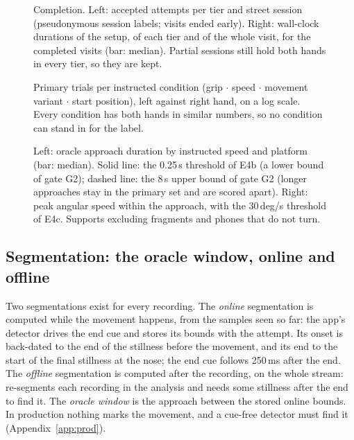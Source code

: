 \begin{figure}[htbp]
\centering
{}
\caption{Completion. Left: accepted attempts per tier and street session (pseudonymous session labels; 
visits ended early). Right: wall-clock durations of the setup, of each tier and of the whole visit, for the
completed visits (bar: median). Partial sessions still hold both hands in every tier, so they are kept.}
\label{fig:S2_03_completion_durations}
\end{figure}

\begin{figure}[htbp]
\centering
{}
\caption{Primary trials per instructed condition (grip $\cdot$ speed $\cdot$ movement variant $\cdot$ start
position), left against right hand, on a log scale. Every condition has both hands in similar numbers, so
no condition can stand in for the label.}
\label{fig:S2_04_conditions}
\end{figure}

\begin{figure}[htbp]
\centering
{}
\caption{Left: oracle approach duration by instructed speed and platform (bar: median). Solid line: the
0.25\,s threshold of E4b (a lower bound of gate G2); dashed line: the 8\,s upper bound of gate G2 (longer
approaches stay in the primary set and are scored apart). Right: peak angular speed within the approach, with
the 30\,deg/s threshold of E4c. Supports excluding fragments and phones that do not turn.}
\label{fig:S2_08_durations_peaks}
\end{figure}


\subsection{Segmentation: the oracle window, online and offline}\label{app:data:segmentation}

Two segmentations exist for every recording. The \emph{online} segmentation is computed while the movement
happens, from the samples seen so far: the app's  detector drives the end cue and stores its
bounds with the attempt. Its onset is back-dated to the end of the stillness before the movement, and its end
to the start of the final stillness at the nose; the end cue follows 250\,ms after the end. The
\emph{offline} segmentation is computed after the recording, on the whole stream:  re-segments
each recording in the analysis and needs some stillness after the end to find it. The \emph{oracle window} is
the approach between the stored online bounds. In production nothing marks the movement, and a cue-free
detector must find it (Appendix~\ref{app:prod}).

